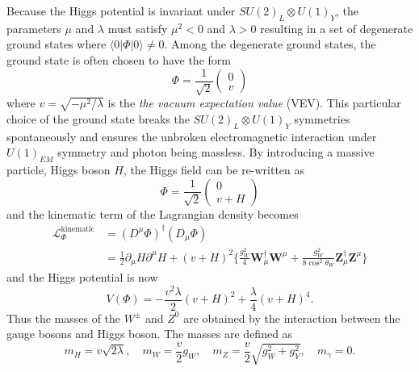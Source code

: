 Because the Higgs potential is invariant under $SU(2)_{L} \otimes U(1)_{Y}$, the parameters $\mu$ and $\lambda$ must satisfy $\mu^{2} < 0$ and $\lambda > 0$ resulting in a set of degenerate ground states where $\langle 0|\Phi|0 \rangle \neq 0$.
Among the degenerate ground states, the ground state is often chosen to have the form
%
\begin{equation}
    \Phi = \frac{1}{\sqrt{2}}\left(\begin{matrix}0\\v\end{matrix}\right)
    \label{eq:sm_ground_state}
\end{equation}
%
where $v = \sqrt{-\mu^{2}/\lambda}$ is the \textit{the vacuum expectation value} (VEV).
This particular choice of the ground state breaks the $SU(2)_{L} \otimes U(1)_{Y}$ symmetries spontaneously and  ensures the unbroken electromagnetic interaction under $U(1)_{EM}$ symmetry and photon being massless.
By introducing a massive particle, Higgs boson $H$, the Higgs field can be re-written as
%
\begin{equation}
    \Phi = \frac{1}{\sqrt{2}}\left(\begin{matrix}0\\v + H\end{matrix}\right)
    \label{eq:sm_ground_state_2}
\end{equation}
%
and the kinematic term of the Lagrangian density becomes
%
\begin{align}
    \mathcal{L}_{\Phi}^{\textrm{kinematic}} & = (D^{\mu}\Phi)^{\dagger}(D_{\mu}\Phi)\\
                                            & = \frac{1}{2}\partial_{\mu}H\partial^{\mu}H + (v + H)^{2}\Big\{\frac{g_{W}^{2}}{4} \bm{W}_{\mu}^{\dagger}\bm{W}^{\mu} + \frac{g_{W}^{2}}{8\cos^{2}\theta_{W}}\bm{Z}_{\mu}^{\dagger}\bm{Z}^{\mu}\Big\}
    \label{eq:sm_Lagrangian_kinematic_term}
\end{align}
%
and the Higgs potential is now
%
\begin{equation}
    V(\Phi) = -\frac{v^{2} \lambda}{2}(v+H)^{2} + \frac{\lambda}{4}(v+H)^{4}.
\end{equation}
%
Thus the masses of the $W^{\pm}$ and $Z^{0}$ are obtained by the interaction between the gauge bosons and Higgs boson.
The masses are defined as
%
\begin{equation}
    m_{H} = v\sqrt{2\lambda}, \quad m_{W} = \frac{v}{2}g_{W}, \quad m_{Z} = \frac{v}{2}\sqrt{g_{W}^{2} + g_{Y}^{2}}, \quad m_{\gamma} = 0.
\end{equation}
